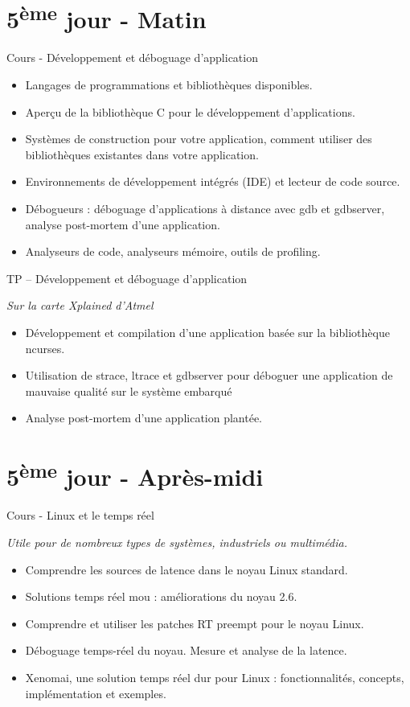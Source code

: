 \documentclass[a4paper,12pt,obeyspaces,spaces,hyphens]{article}
\begin{document}
\section{5\textsuperscript{ème} jour - Matin}

\feagendaonecolumn
{Cours - Développement et déboguage d'application}
{
  \begin{itemize}
  \item Langages de programmations et bibliothèques disponibles.
  \item Aperçu de la bibliothèque C pour le développement d'applications.
  \item Systèmes de construction pour votre application, comment utiliser des
	bibliothèques existantes dans votre application.
  \item Environnements de développement intégrés (IDE) et lecteur de code source.
  \item Débogueurs : déboguage d'applications à distance avec gdb et gdbserver, analyse
	post-mortem d'une application.
  \item Analyseurs de code, analyseurs mémoire, outils de profiling.
  \end{itemize}
}

\feagendaonecolumn
{TP – Développement et déboguage d'application}
{
  {\em Sur la carte Xplained d'Atmel}
  \begin{itemize}
  \item Développement et compilation d'une application basée sur la bibliothèque
	ncurses.
  \item Utilisation de strace, ltrace et gdbserver pour déboguer une application de
	mauvaise qualité sur le système embarqué
  \item Analyse post-mortem d'une application plantée.
  \end{itemize}
}


\section{5\textsuperscript{ème} jour - Après-midi}

\feagendaonecolumn
{Cours - Linux et le temps réel}
{
  {\em Utile pour de nombreux types de systèmes, industriels ou multimédia.}
  \begin{itemize}
  \item Comprendre les sources de latence dans le noyau Linux standard.
  \item Solutions temps réel mou : améliorations du noyau 2.6.
  \item Comprendre et utiliser les patches RT preempt pour le noyau Linux.
  \item Déboguage temps-réel du noyau. Mesure et analyse de la latence.
  \item Xenomai, une solution temps réel dur pour Linux : fonctionnalités, concepts,
	implémentation et exemples.
  \end{itemize}
}
\end{document}
